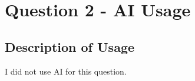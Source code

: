 \documentclass[a4paper,12pt]{article}
\begin{document}
\newpage

\section*{Question 2 - AI Usage}

\subsection*{Description of Usage}
I did not use AI for this question.

\end{document}
